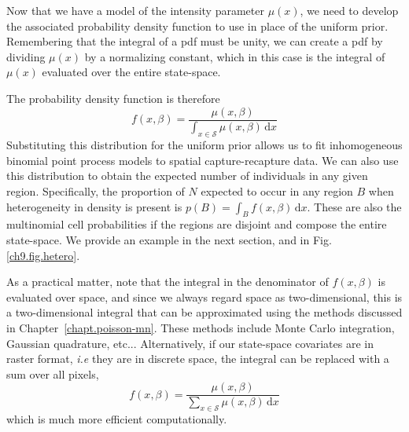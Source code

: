 Now that we have a model of the intensity parameter $\mu(x)$,
we need to develop the associated probability density function to use
in place of the uniform prior. Remembering that
the integral of a pdf must be unity, we can create a pdf by dividing
$\mu(x)$ by a normalizing constant, which in this case is the integral
of $\mu(x)$ evaluated over the entire
state-space. 
The
probability density function is therefore
\begin{equation}
f(x, \beta) = \frac{\mu(x, \beta)}{\int_{x \in \mathcal{S}} \mu(x, \beta)\, \mathrm{d}x}
\label{eq.pdf.ipp}
\end{equation}
Substituting this distribution for the
uniform prior allows us to fit inhomogeneous binomial point process
models to spatial capture-recapture data. We can also use this
distribution to obtain the expected number of individuals in any given
region. Specifically, the proportion of $N$ expected to occur in any
region $B$ when heterogeneity in density is present is $p(B) = \int_B
f(x, \beta)\, \mathrm{d}x$. These are
also the multinomial cell probabilities if the regions are
disjoint and compose the entire state-space. We provide an example in
the next section, and in Fig.\ref{ch9.fig.hetero}.

As a practical matter, note that the integral in the
denominator of $f(x, \beta)$ is evaluated over space, and since we always regard
space as two-dimensional, this is a two-dimensional integral that can
be approximated using the methods discussed in
Chapter~\ref{chapt.poisson-mn}. These methods include
Monte Carlo integration, Gaussian quadrature, etc... Alternatively, if
our state-space covariates are in raster format, \emph{i.e} they are
in discrete space, the integral can be replaced with a sum over
all pixels,
\begin{equation}
f(x, \beta) = \frac{\mu(x, \beta)}{\sum_{x \in \mathcal{S}} \mu(x, \beta)\, \mathrm{d}x}
\label{eq.pdf.dipp.d}
\end{equation}
which is much more efficient computationally.

